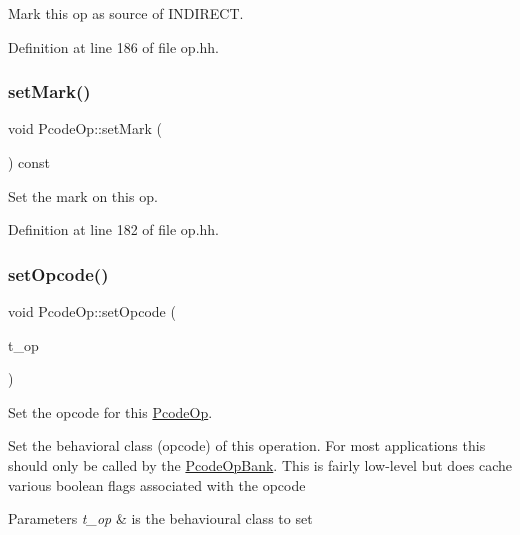 Mark this op as source of I\+N\+D\+I\+R\+E\+CT. 



Definition at line 186 of file op.\+hh.

\mbox{\label{class_pcode_op_a293188b0efd0a693124eec0d26a18483}} 
\subsubsection{\texorpdfstring{setMark()}{setMark()}}
{\footnotesize\ttfamily void Pcode\+Op\+::set\+Mark (\begin{DoxyParamCaption}\item[{void}]{ }\end{DoxyParamCaption}) const\hspace{0.3cm}{\ttfamily [inline]}}



Set the mark on this op. 



Definition at line 182 of file op.\+hh.

\mbox{\label{class_pcode_op_a2a7f9232bab2d185644c3dd0d536ff1b}} 
\subsubsection{\texorpdfstring{setOpcode()}{setOpcode()}}
{\footnotesize\ttfamily void Pcode\+Op\+::set\+Opcode (\begin{DoxyParamCaption}\item[{\mbox{\hyperlink{class_type_op}{Type\+Op}} $\ast$}]{t\+\_\+op }\end{DoxyParamCaption})}



Set the opcode for this \mbox{\hyperlink{class_pcode_op}{Pcode\+Op}}. 

Set the behavioral class (opcode) of this operation. For most applications this should only be called by the \mbox{\hyperlink{class_pcode_op_bank}{Pcode\+Op\+Bank}}. This is fairly low-\/level but does cache various boolean flags associated with the opcode 
\begin{DoxyParams}{Parameters}
{\em t\+\_\+op} & is the behavioural class to set \\
\hline
\end{DoxyParams}



